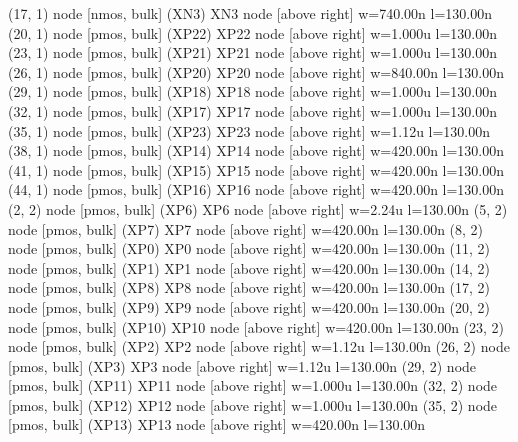 \begin{circuitikz}[american]
	(17, 1) node [nmos, bulk] (XN3) {XN3} node [above right] {\tiny {w=740.00n l=130.00n}}
	(20, 1) node [pmos, bulk] (XP22) {XP22} node [above right] {\tiny {w=1.000u l=130.00n}}
	(23, 1) node [pmos, bulk] (XP21) {XP21} node [above right] {\tiny {w=1.000u l=130.00n}}
	(26, 1) node [pmos, bulk] (XP20) {XP20} node [above right] {\tiny {w=840.00n l=130.00n}}
	(29, 1) node [pmos, bulk] (XP18) {XP18} node [above right] {\tiny {w=1.000u l=130.00n}}
	(32, 1) node [pmos, bulk] (XP17) {XP17} node [above right] {\tiny {w=1.000u l=130.00n}}
	(35, 1) node [pmos, bulk] (XP23) {XP23} node [above right] {\tiny {w=1.12u l=130.00n}}
	(38, 1) node [pmos, bulk] (XP14) {XP14} node [above right] {\tiny {w=420.00n l=130.00n}}
	(41, 1) node [pmos, bulk] (XP15) {XP15} node [above right] {\tiny {w=420.00n l=130.00n}}
	(44, 1) node [pmos, bulk] (XP16) {XP16} node [above right] {\tiny {w=420.00n l=130.00n}}
	(2, 2) node [pmos, bulk] (XP6) {XP6} node [above right] {\tiny {w=2.24u l=130.00n}}
	(5, 2) node [pmos, bulk] (XP7) {XP7} node [above right] {\tiny {w=420.00n l=130.00n}}
	(8, 2) node [pmos, bulk] (XP0) {XP0} node [above right] {\tiny {w=420.00n l=130.00n}}
	(11, 2) node [pmos, bulk] (XP1) {XP1} node [above right] {\tiny {w=420.00n l=130.00n}}
	(14, 2) node [pmos, bulk] (XP8) {XP8} node [above right] {\tiny {w=420.00n l=130.00n}}
	(17, 2) node [pmos, bulk] (XP9) {XP9} node [above right] {\tiny {w=420.00n l=130.00n}}
	(20, 2) node [pmos, bulk] (XP10) {XP10} node [above right] {\tiny {w=420.00n l=130.00n}}
	(23, 2) node [pmos, bulk] (XP2) {XP2} node [above right] {\tiny {w=1.12u l=130.00n}}
	(26, 2) node [pmos, bulk] (XP3) {XP3} node [above right] {\tiny {w=1.12u l=130.00n}}
	(29, 2) node [pmos, bulk] (XP11) {XP11} node [above right] {\tiny {w=1.000u l=130.00n}}
	(32, 2) node [pmos, bulk] (XP12) {XP12} node [above right] {\tiny {w=1.000u l=130.00n}}
	(35, 2) node [pmos, bulk] (XP13) {XP13} node [above right] {\tiny {w=420.00n l=130.00n}}



\end{circuitikz}
